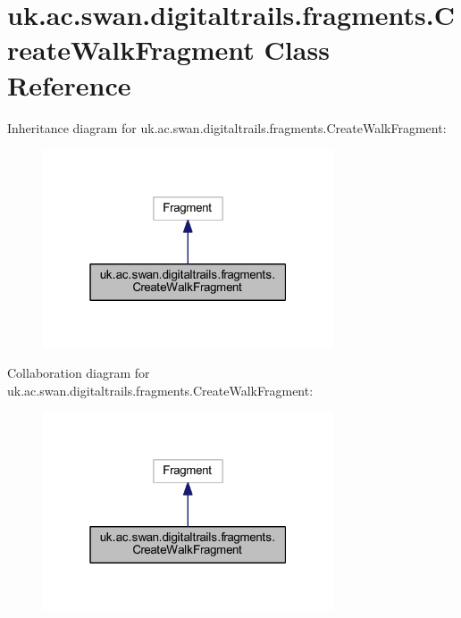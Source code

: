 \hypertarget{classuk_1_1ac_1_1swan_1_1digitaltrails_1_1fragments_1_1_create_walk_fragment}{\section{uk.\+ac.\+swan.\+digitaltrails.\+fragments.\+Create\+Walk\+Fragment Class Reference}
\label{classuk_1_1ac_1_1swan_1_1digitaltrails_1_1fragments_1_1_create_walk_fragment}
}


Inheritance diagram for uk.\+ac.\+swan.\+digitaltrails.\+fragments.\+Create\+Walk\+Fragment\+:\nopagebreak
\begin{figure}[H]
\begin{center}
\leavevmode
\includegraphics[width=244pt]{classuk_1_1ac_1_1swan_1_1digitaltrails_1_1fragments_1_1_create_walk_fragment__inherit__graph}
\end{center}
\end{figure}


Collaboration diagram for uk.\+ac.\+swan.\+digitaltrails.\+fragments.\+Create\+Walk\+Fragment\+:\nopagebreak
\begin{figure}[H]
\begin{center}
\leavevmode
\includegraphics[width=244pt]{classuk_1_1ac_1_1swan_1_1digitaltrails_1_1fragments_1_1_create_walk_fragment__coll__graph}
\end{center}
\end{figure}

